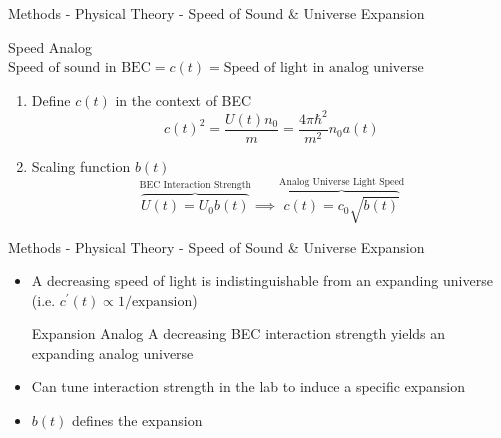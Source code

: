 \documentclass[aspectratio=169]{beamer}
\begin{document}
            \begin{frame}{Methods - Physical Theory - Speed of Sound \& Universe Expansion}
            
                \begin{alertblock}{\centering Speed Analog}
                    $\text{Speed of sound in BEC} = c(t) = \text{Speed of light in analog universe}$
                \end{alertblock}
                    
                \begin{enumerate}
                    \item Define $c(t)$ in the context of BEC
                        \begin{equation} \label{eq:speed}
                            c(t)^2 = \frac{U(t) n_0}{m} = \frac{4 \pi \hbar^2}{m^2} n_0 a(t)
                        \end{equation}
                        
                    \item  Scaling function $b(t)$
                        \begin{equation}
                            \overbrace{U(t) = U_0 b(t)}^\text{BEC Interaction Strength} \implies \overbrace{c(t) = c_0 \sqrt{b(t)}}^\text{Analog Universe Light Speed}
                        \end{equation}
                \end{enumerate}
            \end{frame}
        
            \begin{frame}{Methods - Physical Theory - Speed of Sound \& Universe Expansion}
                \begin{itemize}
                    \item A decreasing speed of light is indistinguishable from an expanding universe (i.e. $c^\prime(t) \propto 1 / \text{expansion}$)
                    
                    \begin{alertblock}{\centering Expansion Analog}
                        A decreasing BEC interaction strength yields an expanding analog universe
                    \end{alertblock}
                        
                    \item Can tune interaction strength in the lab to induce a specific expansion
        
                    \item $b(t)$ defines the expansion
                \end{itemize}
            \end{frame}
\end{document}
